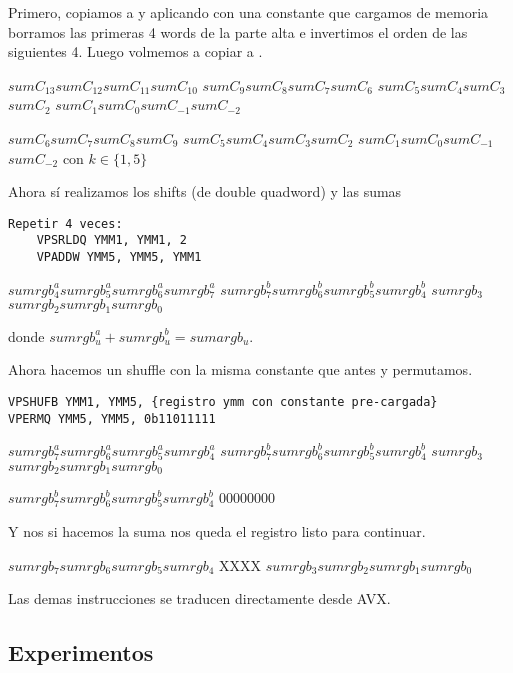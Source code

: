 Primero, copiamos  a  y aplicando  con una constante que cargamos de memoria borramos las primeras 4 words de la parte alta e invertimos el orden de las siguientes 4. Luego volmemos a copiar  a . 

 \ymmWord
{$sumC_{13}$}{$sumC_{12}$}{$sumC_{11}$}{$sumC_{10}$}
{$sumC_9$}{$sumC_8$}{$sumC_7$}{$sumC_6$}
{$sumC_5$}{$sumC_4$}{$sumC_3$}{$sumC_2$}
{$sumC_1$}{$sumC_0$}{$sumC_{-1}$}{$sumC_{-2}$}

 
{$sumC_6$}{$sumC_7$}{$sumC_8$}{$sumC_9$}
{$sumC_5$}{$sumC_4$}{$sumC_3$}{$sumC_2$}
{$sumC_1$}{$sumC_0$}{$sumC_{-1}$}{$sumC_{-2}$}
con $k \in \{1,5\}$

Ahora sí realizamos los shifts (de double quadword) y las sumas

\begin{lstlisting}
Repetir 4 veces:
    VPSRLDQ YMM1, YMM1, 2
    VPADDW YMM5, YMM5, YMM1
\end{lstlisting}

 
{$sumrgb^a_4$}{$sumrgb^a_5$}{$sumrgb^a_6$}{$sumrgb^a_7$}
{$sumrgb^b_7$}{$sumrgb^b_6$}{$sumrgb^b_5$}{$sumrgb^b_4$}
{$sumrgb_3$}{$sumrgb_2$}{$sumrgb_1$}{$sumrgb_0$}

donde $sumrgb^a_u + sumrgb^b_u = sumargb_u$.

Ahora hacemos un shuffle con la misma constante que antes y permutamos.

\begin{lstlisting}
VPSHUFB YMM1, YMM5, {registro ymm con constante pre-cargada}
VPERMQ YMM5, YMM5, 0b11011111
\end{lstlisting}

 
{$sumrgb^a_7$}{$sumrgb^a_6$}{$sumrgb^a_5$}{$sumrgb^a_4$}
{$sumrgb^b_7$}{$sumrgb^b_6$}{$sumrgb^b_5$}{$sumrgb^b_4$}
{$sumrgb_3$}{$sumrgb_2$}{$sumrgb_1$}{$sumrgb_0$}

 
{$sumrgb^b_7$}{$sumrgb^b_6$}{$sumrgb^b_5$}{$sumrgb^b_4$}
{0}{0}{0}{0}{0}{0}{0}{0}

Y nos si hacemos la suma nos queda el registro listo para continuar.

 
{$sumrgb_7$}{$sumrgb_6$}{$sumrgb_5$}{$sumrgb_4$}
{X}{X}{X}{X}
{$sumrgb_3$}{$sumrgb_2$}{$sumrgb_1$}{$sumrgb_0$}

Las demas instrucciones se traducen directamente desde AVX.

\subsection{Experimentos}

